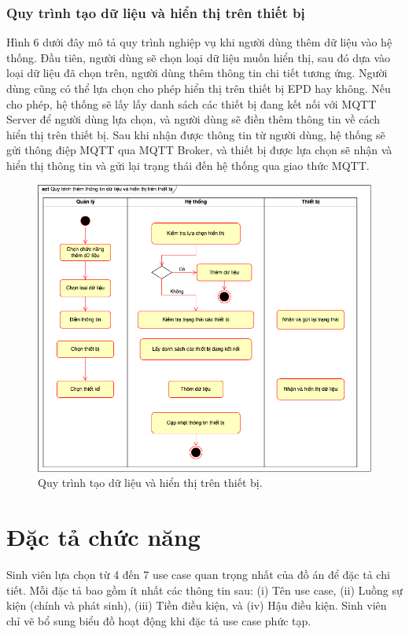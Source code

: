 \documentclass[../DoAn.tex]{subfiles}
\begin{document}
\subsubsection{Quy trình tạo dữ liệu và hiển thị trên thiết bị}
Hình 6 dưới đây mô tả quy trình nghiệp vụ khi người dùng thêm dữ liệu vào hệ thống. Đầu tiên, người dùng sẽ chọn loại dữ liệu muốn hiển thị, sau đó dựa vào loại dữ liệu đã chọn trên, người dùng thêm thông tin chi tiết tương ứng. Người dùng cũng có thể lựa chọn cho phép hiển thị trên thiết bị EPD hay không. Nếu cho phép, hệ thống sẽ lấy lấy danh sách các thiết bị đang kết nối với MQTT Server để người dùng lựa chọn, và người dùng sẽ điền thêm thông tin về cách hiển thị trên thiết bị. Sau khi nhận được thông tin từ người dùng, hệ thống sẽ gửi thông điệp MQTT qua MQTT Broker, và thiết bị được lựa chọn sẽ nhận và hiển thị thông tin và gửi lại trạng thái đến hệ thống qua giao thức MQTT.

\begin{figure}[h]
    \centering
    \includegraphics[scale=0.6]{imgs/diagrams/act_addData.png}
    \caption{Quy trình tạo dữ liệu và hiển thị trên thiết bị.}
    \label{fig:uc-general}
\end{figure}

\section{Đặc tả chức năng}
\label{section:2.3}
Sinh viên lựa chọn từ 4 đến 7 use case quan trọng nhất của đồ án để đặc tả chi tiết. Mỗi đặc tả bao gồm ít nhất các thông tin sau: (i) Tên use case, (ii) Luồng sự kiện (chính và phát sinh), (iii) Tiền điều kiện, và (iv) Hậu điều kiện. Sinh viên chỉ vẽ bổ sung biểu đồ hoạt động khi đặc tả use case phức tạp.
\end{document}

